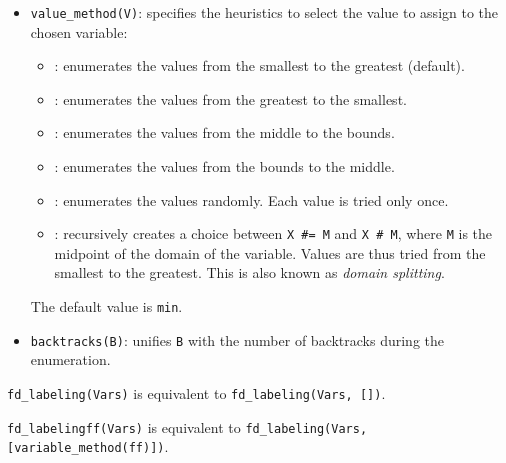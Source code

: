 \begin{itemize}
\item {}\texttt{value\_method(V)}: specifies the heuristics
to select the value to assign to the chosen variable:

\begin{itemize}

\item {}: enumerates the values from the smallest to the greatest
(default).

\item {}: enumerates the values from the greatest to the smallest.

\item {}: enumerates the values from the middle to the bounds.

\item {}: enumerates the values from the bounds to the middle.

\item {}: enumerates the values randomly. Each value is tried
  only once.

\item {}: recursively creates a choice between \texttt{X \#={\lt}
    M} and \texttt{X \#{\gt} M}, where \texttt{M} is the midpoint of the
  domain of the variable. Values are thus tried from the smallest to the
  greatest. This is also known as \textit{domain splitting}.

\end{itemize}

\BL The default value is \texttt{min}.

\item {}\texttt{backtracks(B)}: unifies \texttt{B} with the
number of backtracks during the enumeration.

\end{itemize}

\texttt{fd\_labeling(Vars)} is equivalent to \texttt{fd\_labeling(Vars,
[])}.

\texttt{fd\_labelingff(Vars)} is equivalent to \texttt{fd\_labeling(Vars,
[variable\_method(ff)])}.


